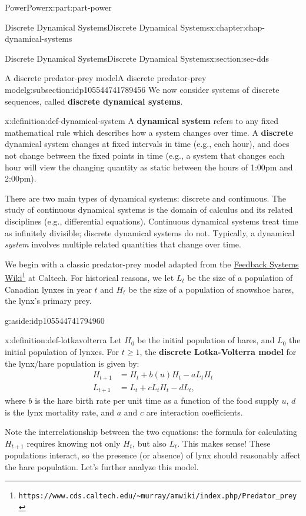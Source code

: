 \documentclass[oneside,10pt,]{book}
\newcommand{\terminology}[1]{\textbf{#1}}
\numberwithin{equation}{section}
\renewcommand{\ge}{\geqslant}
\newcommand{\amp}{&}
\begin{document}
\begin{partptx}{Power}{}{Power}{}{}{x:part:part-power}
\begin{chapterptx}{Discrete Dynamical Systems}{}{Discrete Dynamical Systems}{}{}{x:chapter:chap-dynamical-systems}
\begin{sectionptx}{Discrete Dynamical Systems}{}{Discrete Dynamical Systems}{}{}{x:section:sec-dds}
\begin{subsectionptx}{A discrete predator-prey model}{}{A discrete predator-prey model}{}{}{g:subsection:idp105544741789456}
We now consider systems of discrete sequences, called \terminology{discrete dynamical systems}.%
\begin{definition}{}{x:definition:def-dynamical-system}%
A \terminology{dynamical system} refers to any fixed mathematical rule which describes how a system changes over time. A \terminology{discrete} dynamical system changes at fixed intervals in time (e.g., each hour), and does not change between the fixed points in time (e.g., a system that changes each hour will view the changing quantity as static between the hours of 1:00pm and 2:00pm).%
\end{definition}
There are two main types of dynamical systems: discrete and continuous. The study of continuous dynamical systems is the domain of calculus and its related disciplines (e.g., differential equations). Continuous dynamical systems treat time as infinitely divisible; discrete dynamical systems do not. Typically, a dynamical \emph{system} involves multiple related quantities that change over time.%
\par
We begin with a classic predator-prey model adapted from the \href{https://www.cds.caltech.edu/\~murray/amwiki/index.php/Predator_prey}{Feedback Systems Wiki}\footnote{\nolinkurl{https://www.cds.caltech.edu/\~murray/amwiki/index.php/Predator_prey}\label{g:fn:idp105544741793424}} at Caltech. For historical reasons, we let \(L_t\) be the size of a population of Canadian lynxes in year \(t\) and \(H_t\) be the size of a population of snowshoe hares, the lynx's primary prey. \begin{aside}{}{g:aside:idp105544741794960}%
\end{aside}
%
\begin{definition}{}{x:definition:def-lotkavolterra}%
Let \(H_0\) be the initial population of hares, and \(L_0\) the initial population of lynxes. For \(t\ge 1\), the \terminology{discrete Lotka-Volterra model} for the lynx\slash{}hare population is given by:%
%
\begin{align*}
H_{t+1} \amp = H_t + b(u) H_t - a L_t H_t\\
L_{t+1} \amp = L_t + c L_t H_t - d L_t,
\end{align*}
where \(b\) is the hare birth rate per unit time as a function of the food supply \(u\), \(d\) is the lynx mortality rate, and \(a\) and \(c\) are interaction coefficients.%
\end{definition}
Note the interrelationship between the two equations: the formula for calculating \(H_{t+1}\) requires knowing not only \(H_t\), but also \(L_t\). This makes sense! These populations interact, so the presence (or absence) of lynx should reasonably affect the hare population. Let's further analyze this model.%

\end{subsectionptx}
\end{sectionptx}
\end{chapterptx}
\end{partptx}
\end{document}
